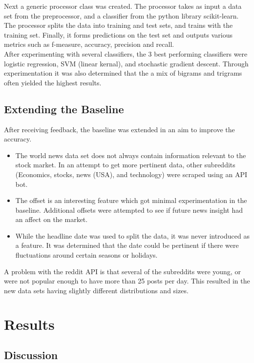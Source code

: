 \documentclass[11pt,a4paper]{article}
\begin{document}
Next a generic processor class was created. The processor takes as input a data set from the preprocessor, and a classifier from the python library scikit-learn. The processor splits the data into training and test sets, and trains with the training set. Finally, it forms predictions on the test set and outputs various metrics such as f-measure, accuracy, precision and recall.\\

After experimenting with several classifiers, the 3 best performing classifiers were logistic regression, SVM (linear kernal), and stochastic gradient descent. Through experimentation it was also determined that the a mix of bigrams and trigrams often yielded the highest results.

\subsection{Extending the Baseline}
After receiving feedback, the baseline was extended in an aim to improve the accuracy.
\begin{itemize}
\item The world news data set does not always contain information relevant to the stock market. In an attempt to get more pertinent data, other subreddits (Economics, stocks, news (USA), and technology) were scraped using an API bot.

\item The offset is an interesting feature which got minimal experimentation in the baseline. Additional offsets were attempted to see if future news insight had an affect on the market.

\item While the headline date was used to split the data, it was never introduced as a feature. It was determined that the date could be pertinent if there were fluctuations around certain seasons or holidays.
\end{itemize}

A problem with the reddit API is that several of the subreddits were young, or were not popular enough to have more than 25 posts per day. This resulted in the new data sets having slightly different distributions and sizes.\\


\section{Results}
\subsection{Discussion}
\end{document}
